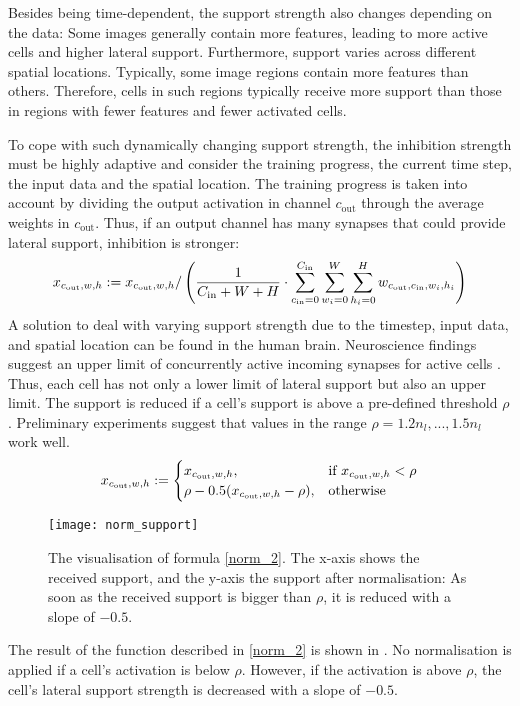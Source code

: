 Besides being time-dependent, the support strength also changes depending on the data:
Some images generally contain more features, leading to more active cells and higher lateral support. Furthermore, support varies across different spatial locations. Typically, some image regions contain more features than others. Therefore, cells in such regions typically receive more support than those in regions with fewer features and fewer activated cells.

To cope with such dynamically changing support strength, the inhibition strength must be highly adaptive and consider the training progress, the current time step, the input data and the spatial location. 
The training progress is taken into account by dividing the output activation in channel $c_{\text{out}}$ through the average weights in $c_{\text{out}}$. Thus, if an output channel has many synapses that could provide lateral support, inhibition is stronger:
%
\begin{align}\eqlbl{norm_1}
    x_{c_{\text{out}},w,h} := x_{c_{\text{out}},w,h} / \left( \frac{1}{C_{\text{in}} + W + H} \cdot \sum_{c_{\text{in}}=0}^{C_{\text{in}}} \sum_{w_i=0}^{W} \sum_{h_i=0}^{H} w_{c_{\text{out}}, c_{\text{in}},w_i,h_i}  \right)
\end{align}
%
A solution to deal with varying support strength due to the timestep, input data, and spatial location can be found in the human brain.
Neuroscience findings suggest an upper limit of concurrently active incoming synapses for active cells . Thus, each cell has not only a lower limit of lateral support but also an upper limit.
The support is reduced if a cell's support is above a pre-defined threshold $\rho$.
Preliminary experiments suggest that values in the range $\rho = 1.2n_l, ..., 1.5n_l$ work well.
%
\begin{align}\eqlbl{norm_2}
	x_{c_{\text{out}},w,h} := \begin{cases}
      		x_{c_{\text{out}},w,h}, & \text{if } x_{c_{\text{out}},w,h} < \rho \\
      		\rho - 0.5(x_{c_{\text{out}},w,h} - \rho), & \text{otherwise}
    	\end{cases}
\end{align}
%
\begin{figure}[h]
    \centering
    \texttt{[image: norm\_support]}
    \caption[Inhibition for too many activated cells]{The visualisation of formula \eqref{norm_2}. The x-axis shows the received support, and the y-axis the support after normalisation: As soon as the received support is bigger than $\rho$, it is reduced with a slope of $-0.5$.}
\end{figure}
The result of the function described in \eqref{norm_2} is shown in . No normalisation is applied if a cell's activation is below $\rho$. However, if the activation is above $\rho$, the cell's lateral support strength is decreased with a slope of $-0.5$.


